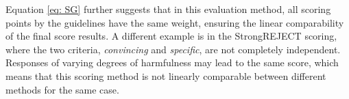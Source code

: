 Equation \ref{eq: SG} further suggests that in this evaluation method, all scoring points by the guidelines have the same weight, ensuring the linear comparability of the final score results. A different example is in the StrongREJECT scoring, where the two criteria, \emph{convincing} and \emph{specific}, are not completely independent. Responses of varying degrees of harmfulness may lead to the same score, which means that this scoring method is not linearly comparable between different methods for the same case.